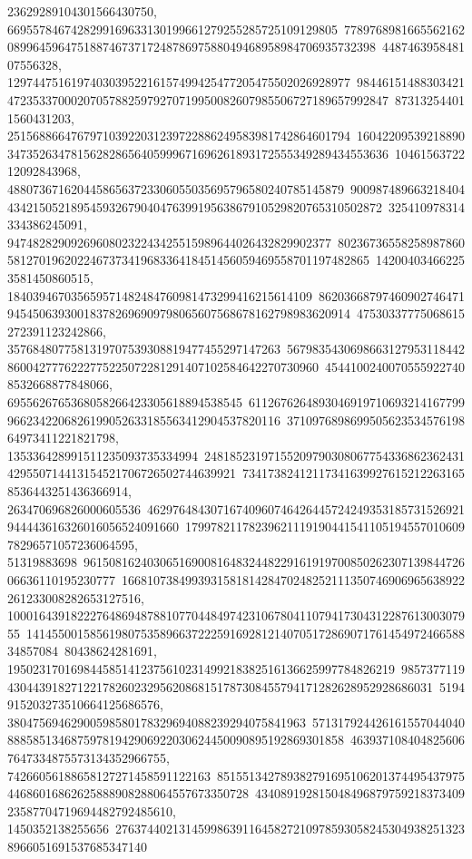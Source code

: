 {{{23629289104301566430750, 6695578467428299169633130199661279255285725109129805\
77897689816655621620899645964751887467371724878697588049468958984706935732398\
448746395848107556328, 129744751619740303952216157499425477205475502026928977\
98446151488303421472353370002070578825979270719950082607985506727189657992847\
873132544011560431203, 251568866476797103922031239722886249583981742864601794\
16042209539218890347352634781562828656405999671696261893172555349289434553636\
1046156372212092843968, 48807367162044586563723306055035695796580240785145879\
90098748966321840443421505218954593267904047639919563867910529820765310502872\
325410978314334386245091, 947482829092696080232243425515989644026432829902377\
80236736558258987860581270196202246737341968336418451456059469558701197482865\
142004034662253581450860515, 184039467035659571482484760981473299416215614109\
86203668797460902746471945450639300183782696909798065607568678162798983620914\
47530337775068615272391123242866, 3576848077581319707539308819477455297147263\
56798354306986631279531184428600427776222775225072281291407102584642270730960\
45441002400705559227408532668877848066, 6955626765368058266423305618894538545\
61126762648930469197106932141677999662342206826199052633185563412904537820116\
371097689869950562353457619864973411221821798, 135336428991511235093735334994\
24818523197155209790308067754336862362431429550714413154521706726502744639921\
734173824121173416399276152122631658536443251436366914, 263470696826000605536\
46297648430716740960746426445724249353185731526921944443616326016056524091660\
1799782117823962111919044154110519455701060978296571057236064595, 51319883698\
96150816240306516900816483244822916191970085026230713984472606636110195230777\
166810738499393158181428470248252111350746906965638922261233008282653127516, 
   10001643918222764869487881077044849742310678041107941730431228761300307955\
14145500158561980753589663722259169281214070517286907176145497246658834857084\
80438624281691, 1950231701698445851412375610231499218382516136625997784826219\
98573771194304439182712217826023295620868151787308455794171282628952928686031\
5194915203273510664125686576, 38047569462900598580178329694088239294075841963\
57131792442616155704404088858513468759781942906922030624450090895192869301858\
4639371084048256067647334875573134352966755, 74266056188658127271458591122163\
85155134278938279169510620137449543797544686016862625888908288064557673350728\
43408919281504849687975921837340923587704719694482792485610, 1450352138255656\
27637440213145998639116458272109785930582453049382513238966051691537685347140\
}}}
